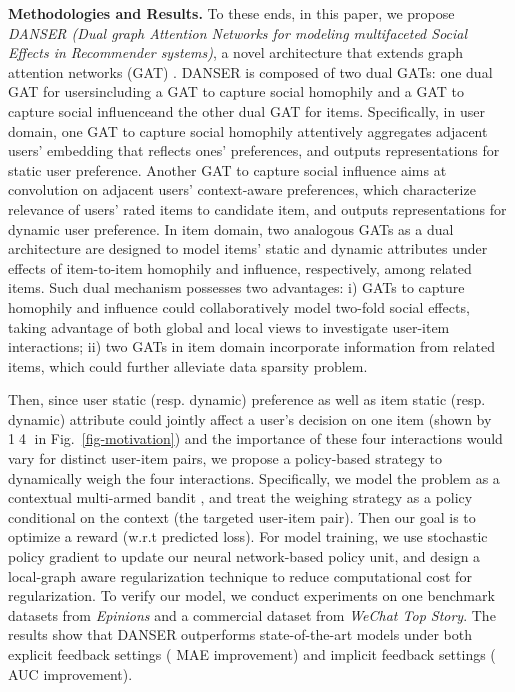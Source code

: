 \documentclass[sigconf]{acmart}
\begin{document}
\textbf{Methodologies and Results.} To these ends, in this paper, we propose \emph{DANSER (Dual graph Attention Networks for modeling multifaceted Social Effects in Recommender systems)}, a novel architecture that extends graph attention networks (GAT) \cite{GAT}. DANSER is composed of two dual GATs: one dual GAT for users{\textemdash}including a GAT to capture social homophily and a GAT to capture social influence{\textemdash}and the other dual GAT for items. Specifically, in user domain, one GAT to capture social homophily attentively aggregates adjacent users' embedding that reflects ones' preferences, and outputs representations for static user preference. 
Another GAT to capture social influence aims at convolution on adjacent users' context-aware preferences, which characterize relevance of users' rated items to candidate item, and outputs representations for dynamic user preference. 
In item domain, two analogous GATs as a dual architecture are designed to model items' static and dynamic attributes under effects of item-to-item homophily and influence, respectively, among related items. 
Such dual mechanism possesses two advantages: i) GATs to capture homophily and influence could collaboratively model two-fold social effects, taking advantage of both global and local views to investigate user-item interactions; ii) two GATs in item domain incorporate information from related items, which could further alleviate data sparsity problem.

Then, since user static ({resp.} dynamic) preference as well as item static ({resp.} dynamic) attribute could jointly affect a user's decision on one item (shown by \textcircled{1}\textcircled{4} in Fig.~\ref{fig-motivation}) and the importance of these four interactions would vary for distinct user-item pairs, we propose a policy-based strategy to dynamically weigh the four interactions. 
Specifically, we model the problem as a contextual multi-armed bandit \cite{Multi-armed}, and treat the weighing strategy as a policy conditional on the context (the targeted user-item pair). 
Then our goal is to optimize a reward (w.r.t predicted loss). 
For model training, we use stochastic policy gradient to update our neural network-based policy unit, and design a local-graph aware regularization technique to reduce computational cost for regularization. 
To verify our model, we conduct experiments on one benchmark datasets from \textit{Epinions} and a commercial dataset from \textit{WeChat Top Story}. The results show that DANSER outperforms state-of-the-art models under both explicit feedback settings ( MAE improvement) and implicit feedback settings ( AUC improvement).
\end{document}
